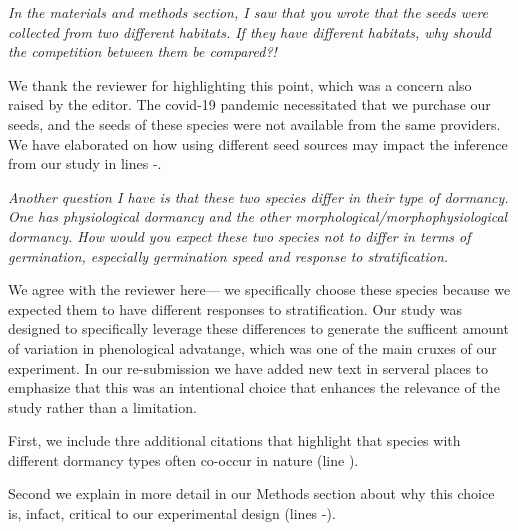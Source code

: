 \documentclass[11pt]{article}
\begin{document}
\emph{In the materials and methods section, I saw that you wrote that the seeds were collected from two different habitats. If they have different habitats, why should the competition between them be compared?!}

We thank the reviewer for highlighting this point, which was a concern also raised by the editor. The covid-19 pandemic necessitated that we purchase our seeds, and the seeds of these species were not available from the same providers. We have elaborated on how using different seed sources may impact the inference from our study in lines -.

\emph{Another question I have is that these two species differ in their type of dormancy. One has physiological dormancy and the other morphological/morphophysiological dormancy. How would you expect these two species not to differ in terms of germination, especially germination speed and response to stratification.}

We agree with the reviewer here--- we specifically choose these species because we expected them to have different responses to stratification. 
Our study was designed to specifically leverage these differences to generate the sufficent amount of variation in phenological advatange, which was one of the main cruxes of our experiment. In our re-submission we have added new text in serveral places to emphasize that this was an intentional choice that enhances the relevance of the study rather than a limitation.

First, we include thre additional citations that highlight that species with different dormancy types often co-occur in nature (line ).

Second we explain in more detail in our Methods section about why this choice is, infact, critical to our experimental design (lines -).
\end{document}
